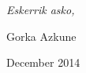 \begin{acknowledgements}
\begin{flushright}
\textit{Eskerrik asko,}

Gorka Azkune

December 2014







\end{flushright}



\end{acknowledgements}



